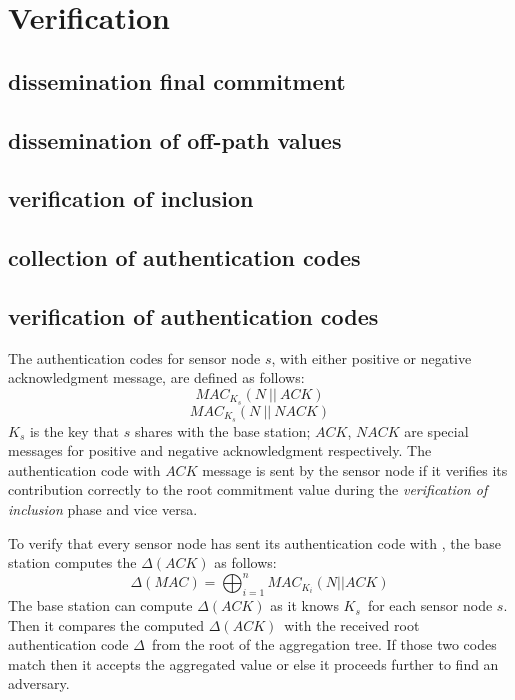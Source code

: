 \chapter{Verification}

\section{dissemination final commitment}
\section{dissemination of off-path values}
\section{verification of inclusion}
\section{collection of authentication codes}
\section{verification of authentication codes}
	The authentication codes for sensor node $s$, with either positive or negative acknowledgment message, are defined as follows:
	\begin{equation}
		MAC_{K_{s}}(N\ ||\ \textit{ACK})
	\end{equation}
	\begin{equation}
		MAC_{K_{s}}(N\ ||\ \textit{NACK})
	\end{equation}
	$K_{s}$ is the key that $s$ shares with the base station;
	$\textit{ACK}$, $\textit{NACK}$ are special messages for positive and negative acknowledgment respectively.
	The authentication code with $\textit{ACK}$ message is sent by the sensor node if it verifies its contribution correctly to the root commitment value during the 
	\textit{verification of inclusion} phase and vice versa.
	
	To verify that every sensor node has sent its authentication code with \ack, the base station computes the $\Delta(ACK)$ as follows:
	\begin{equation}
		\displaystyle{\Delta(MAC) = \bigoplus_{i = 1}^n MAC_{K_{i}}(N || ACK) }
	\end{equation}
	The base station can compute $\Delta(ACK)$ as it knows $K_{s}$\ for each sensor node $s$.
	Then it compares the computed $\Delta(ACK)$\ with the received root authentication code $\Delta$\ from the root of the aggregation tree. 
	If those two codes match then it accepts the aggregated value or else it proceeds further to find an adversary. 

